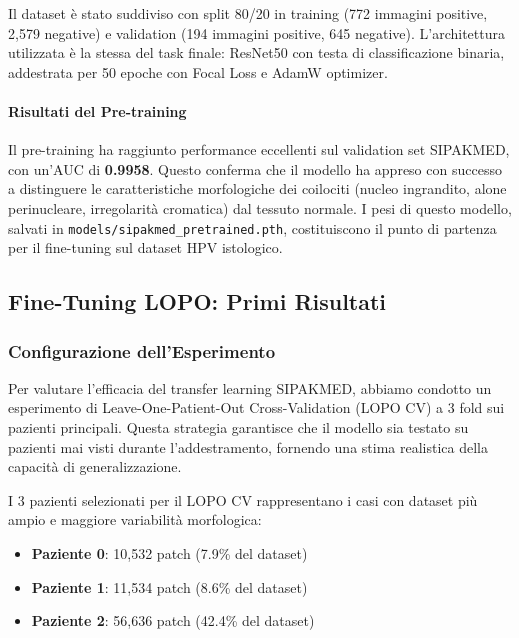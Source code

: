 	Il dataset è stato suddiviso con split 80/20 in training (772 immagini positive, 2,579 negative) e validation (194 immagini positive, 645 negative). L'architettura utilizzata è la stessa del task finale: ResNet50 con testa di classificazione binaria, addestrata per 50 epoche con Focal Loss e AdamW optimizer.
	
	\paragraph{Risultati del Pre-training}
	Il pre-training ha raggiunto performance eccellenti sul validation set SIPAKMED, con un'AUC di \textbf{0.9958}. Questo conferma che il modello ha appreso con successo a distinguere le caratteristiche morfologiche dei coilociti (nucleo ingrandito, alone perinucleare, irregolarità cromatica) dal tessuto normale. I pesi di questo modello, salvati in \texttt{models/sipakmed\_pretrained.pth}, costituiscono il punto di partenza per il fine-tuning sul dataset HPV istologico.
	
	\subsection{Fine-Tuning LOPO: Primi Risultati}
	
	\subsubsection{Configurazione dell'Esperimento}
	
	Per valutare l'efficacia del transfer learning SIPAKMED, abbiamo condotto un esperimento di Leave-One-Patient-Out Cross-Validation (LOPO CV) a 3 fold sui pazienti principali. Questa strategia garantisce che il modello sia testato su pazienti mai visti durante l'addestramento, fornendo una stima realistica della capacità di generalizzazione.
	
	I 3 pazienti selezionati per il LOPO CV rappresentano i casi con dataset più ampio e maggiore variabilità morfologica:
	
	\begin{itemize}
		\item \textbf{Paziente 0}: 10,532 patch (7.9\% del dataset)
		\item \textbf{Paziente 1}: 11,534 patch (8.6\% del dataset)
		\item \textbf{Paziente 2}: 56,636 patch (42.4\% del dataset)
	\end{itemize}
	
